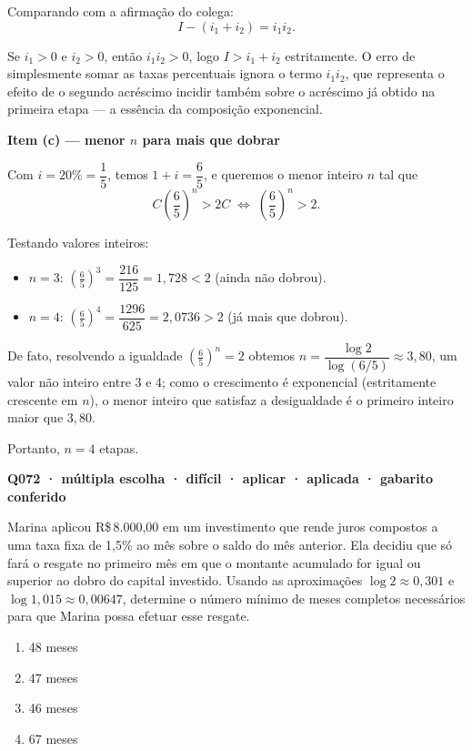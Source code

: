 \documentclass[11pt,a4paper]{article}
\begin{document}
Comparando com a afirmação do colega:
$$I - (i_1+i_2) = i_1 i_2.$$

Se $i_1>0$ e $i_2>0$, então $i_1 i_2>0$, logo $I > i_1+i_2$ estritamente. O erro de simplesmente somar as taxas percentuais ignora o termo $i_1 i_2$, que representa o efeito de o segundo acréscimo incidir também sobre o acréscimo já obtido na primeira etapa — a essência da composição exponencial.

\textbf{Item (c) — menor $n$ para mais que dobrar}

Com $i=20\% = \dfrac{1}{5}$, temos $1+i = \dfrac{6}{5}$, e queremos o menor inteiro $n$ tal que
$$C\left(\frac{6}{5}\right)^n > 2C \;\Longleftrightarrow\; \left(\frac{6}{5}\right)^n > 2.$$

Testando valores inteiros:
\begin{itemize}[nosep,leftmargin=*]
\item $n=3$: $\left(\frac{6}{5}\right)^3 = \dfrac{216}{125} = 1{,}728 < 2$ (ainda não dobrou).
\item $n=4$: $\left(\frac{6}{5}\right)^4 = \dfrac{1296}{625} = 2{,}0736 > 2$ (já mais que dobrou).
\end{itemize}

De fato, resolvendo a igualdade $\left(\frac{6}{5}\right)^n = 2$ obtemos $n = \dfrac{\log 2}{\log(6/5)} \approx 3{,}80$, um valor não inteiro entre 3 e 4; como o crescimento é exponencial (estritamente crescente em $n$), o menor inteiro que satisfaz a desigualdade é o primeiro inteiro maior que $3{,}80$.

Portanto, $n = 4$ etapas.

\bigskip\noindent\textbf{Q072 · múltipla escolha · difícil · aplicar · aplicada · gabarito conferido}\par\nopagebreak
Marina aplicou R\$\,8.000,00 em um investimento que rende juros compostos a uma taxa fixa de 1,5\% ao mês sobre o saldo do mês anterior. Ela decidiu que só fará o resgate no primeiro mês em que o montante acumulado for igual ou superior ao dobro do capital investido. Usando as aproximações $\log 2 \approx 0,301$ e $\log 1,015 \approx 0,00647$, determine o número mínimo de meses completos necessários para que Marina possa efetuar esse resgate.
\begin{enumerate}[label=(\alph*)]
\item 48 meses
\item 47 meses
\item 46 meses
\item 67 meses
\end{enumerate}
\end{document}
